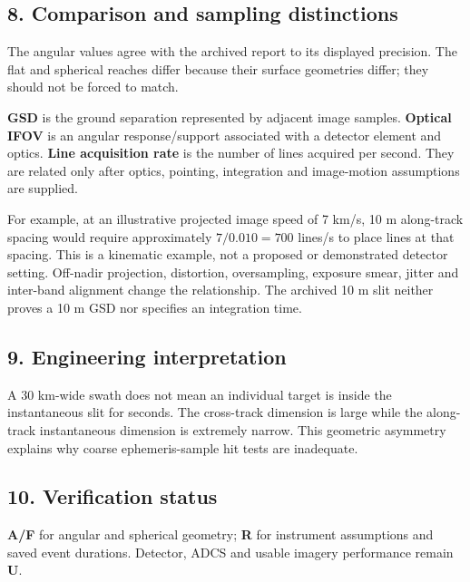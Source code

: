 \documentclass[10pt,a4paper]{article}
\numberwithin{equation}{section}
\begin{document}
\subsection*{8. Comparison and sampling distinctions}
\begin{sloppypar}The angular values agree with the archived report to its displayed precision. The flat and spherical reaches differ because their surface geometries differ; they should not be forced to match.\end{sloppypar}


\begin{sloppypar}\textbf{GSD} is the ground separation represented by adjacent image samples. \textbf{Optical IFOV} is an angular response/support associated with a detector element and optics. \textbf{Line acquisition rate} is the number of lines acquired per second. They are related only after optics, pointing, integration and image-motion assumptions are supplied.\end{sloppypar}


\begin{sloppypar}For example, at an illustrative projected image speed of 7 km/s, 10 m along-track spacing would require approximately \(7/0.010=700\) lines/s to place lines at that spacing. This is a kinematic example, not a proposed or demonstrated detector setting. Off-nadir projection, distortion, oversampling, exposure smear, jitter and inter-band alignment change the relationship. The archived 10 m slit neither proves a 10 m GSD nor specifies an integration time.\end{sloppypar}


\subsection*{9. Engineering interpretation}
\begin{sloppypar}A 30 km-wide swath does not mean an individual target is inside the instantaneous slit for seconds. The cross-track dimension is large while the along-track instantaneous dimension is extremely narrow. This geometric asymmetry explains why coarse ephemeris-sample hit tests are inadequate.\end{sloppypar}


\subsection*{10. Verification status}
\begin{sloppypar}\textbf{A/F} for angular and spherical geometry; \textbf{R} for instrument assumptions and saved event durations. Detector, ADCS and usable imagery performance remain \textbf{U}.\end{sloppypar}
\end{document}
